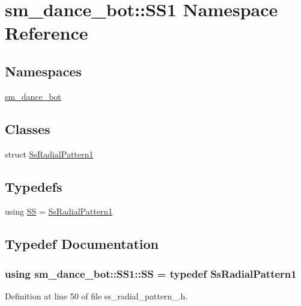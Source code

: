 \hypertarget{namespacesm__dance__bot_1_1SS1}{}\section{sm\+\_\+dance\+\_\+bot\+:\+:S\+S1 Namespace Reference}
\label{namespacesm__dance__bot_1_1SS1}
\subsection*{Namespaces}
\begin{DoxyCompactItemize}
\item 
 \hyperlink{namespacesm__dance__bot_1_1SS1_1_1sm__dance__bot}{sm\+\_\+dance\+\_\+bot}
\end{DoxyCompactItemize}
\subsection*{Classes}
\begin{DoxyCompactItemize}
\item 
struct \hyperlink{structsm__dance__bot_1_1SS1_1_1SsRadialPattern1}{Ss\+Radial\+Pattern1}
\end{DoxyCompactItemize}
\subsection*{Typedefs}
\begin{DoxyCompactItemize}
\item 
using \hyperlink{namespacesm__dance__bot_1_1SS1_a84fc38da71be89ddc4805298f7b82c66}{SS} = \hyperlink{structsm__dance__bot_1_1SS1_1_1SsRadialPattern1}{Ss\+Radial\+Pattern1}
\end{DoxyCompactItemize}


\subsection{Typedef Documentation}
\subsubsection[{\texorpdfstring{SS}{SS}}]{\setlength{\rightskip}{0pt plus 5cm}using {\bf sm\+\_\+dance\+\_\+bot\+::\+S\+S1\+::\+SS} = typedef {\bf Ss\+Radial\+Pattern1}}\hypertarget{namespacesm__dance__bot_1_1SS1_a84fc38da71be89ddc4805298f7b82c66}{}\label{namespacesm__dance__bot_1_1SS1_a84fc38da71be89ddc4805298f7b82c66}


Definition at line 50 of file ss\+\_\+radial\+\_\+pattern\+\_.\+h.

